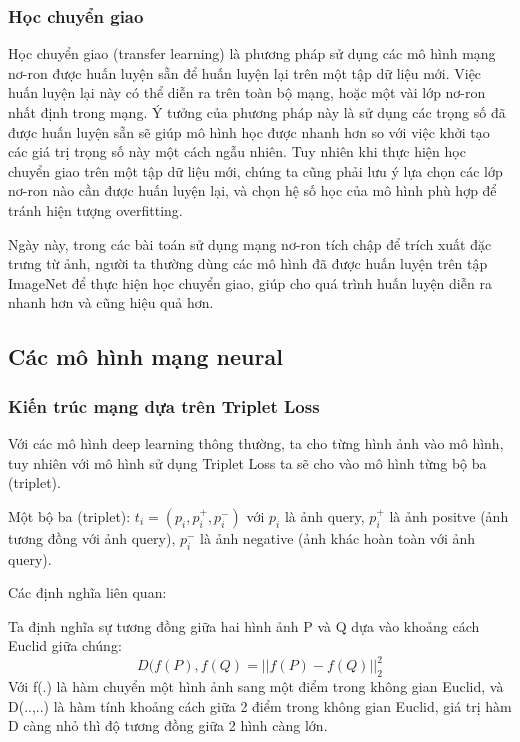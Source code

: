 \documentclass[a4paper,14pt]{extreport}
\begin{document}
\subsubsection*{ Học chuyển giao }
Học chuyển giao (transfer learning) là phương pháp sử dụng các mô hình mạng nơ-ron được huấn luyện 
sẵn để huấn luyện lại trên một tập dữ liệu mới. Việc huấn luyện lại này có thể diễn ra trên toàn bộ mạng, 
hoặc một vài lớp nơ-ron nhất định trong mạng. Ý tưởng của phương pháp này là sử dụng các trọng số đã được 
huấn luyện sẵn sẽ giúp mô hình học được nhanh hơn so với việc khởi tạo các giá trị trọng số này một cách
 ngẫu nhiên. Tuy nhiên khi thực hiện học chuyển giao trên một tập dữ liệu mới, chúng ta cũng phải lưu ý 
 lựa chọn các lớp nơ-ron nào cần được huấn luyện lại, và chọn hệ số học của mô hình phù hợp để tránh hiện 
 tượng overfitting.
\par 
Ngày này, trong các bài toán sử dụng mạng nơ-ron tích chập để trích xuất đặc trưng từ ảnh, người ta 
thường dùng các mô hình đã được huấn luyện trên tập ImageNet để thực hiện học chuyển giao, giúp cho quá 
trình huấn luyện diễn ra nhanh hơn và cũng hiệu quả hơn.

\subsection{Các mô hình mạng neural}

\subsubsection*{ Kiến trúc mạng dựa trên Triplet Loss }


Với các mô hình deep learning thông thường, ta cho từng hình ảnh vào mô hình, tuy nhiên với mô hình sử dụng Triplet Loss ta sẽ cho vào mô hình từng bộ ba (triplet).

Một bộ ba (triplet): $t_i = (p_i,p_i^{+},p_i^{-})$ với $p_i$ là ảnh query, $p_i^{+}$ là ảnh positve (ảnh tương đồng với ảnh query), $p_i^{-}$ là ảnh negative (ảnh khác hoàn toàn với ảnh query).

Các định nghĩa liên quan:

Ta định nghĩa sự tương đồng giữa hai hình ảnh P và Q dựa vào khoảng cách Euclid giữa chúng:
\[ D(f(P),f(Q) = {||f(P) - f(Q)||}_2^2\]
Với f(.) là hàm chuyển một hình ảnh sang một điểm trong không gian Euclid, và D(..,..) là hàm tính khoảng cách giữa 2 điểm trong không gian Euclid, giá trị hàm D càng nhỏ thì độ tương đồng giữa 2 hình càng lớn.
\end{document}
